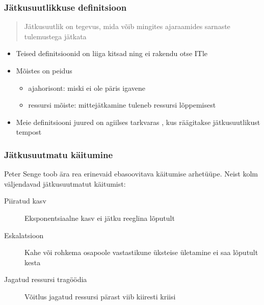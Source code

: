 \begin{frame}[fragile]
  \frametitle{Jätkusuutlikkuse definitsioon}
  \begin{center}
  	\begin{quote}
		Jätkusuutlik on tegevus, mida võib mingites ajaraamides sarnaste tulemustega jätkata 
	\end{quote}
  \end{center}

	\begin{itemize}
		\item Teised definitsioonid on liiga kitsad ning ei rakendu otse ITle
		\item Mõistes on peidus 
		\begin{itemize}
			\item ajahorisont: miski ei ole päris igavene
			\item ressursi mõiste: mittejätkamine tuleneb ressursi lõppemisest
		\end{itemize}
		
		\item Meie definitsiooni juured on agiilses tarkvaras \citep{sustainable}, kus räägitakse jätkusuutlikust tempost
	\end{itemize}
\end{frame}

\begin{frame}[fragile]
  \frametitle{Jätkusuutmatu käitumine}
	Peter Senge toob ära rea erinevaid ebasoovitava käitumise arhetüüpe. Neist kolm väljendavad jätkusuutmatut käitumist:
	
	\begin{description}
		\item[Piiratud kasv] Eksponentsiaalne kasv ei jätku reeglina lõputult
		\item[Eskalatsioon] Kahe või rohkema osapoole vastastikune üksteise ületamine ei saa lõputult kesta
		\item[Jagatud ressursi tragöödia] Võitlus jagatud ressursi pärast viib kiiresti kriisi
	\end{description}	
\end{frame}

